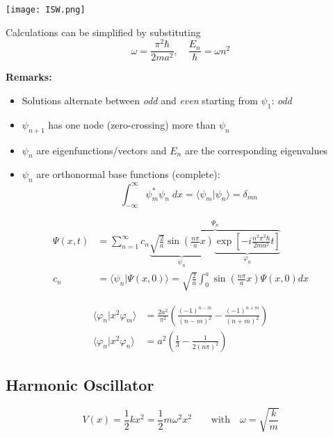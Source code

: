 \begin{center}
    \texttt{[image: ISW.png]}
\end{center}

Calculations can be simplified by substituting
\begin{equation*}
    \omega = \frac{\pi^2 \hbar}{2m a^2},\quad \frac{E_n}{\hbar} = \omega n^2
\end{equation*}

\textbf{Remarks:}
\begin{itemize}
    \item Solutions alternate between \textit{odd} and \textit{even} starting from $\psi_1$: \textit{odd}
    \item $\psi_{n+1}$ has one node (zero-crossing) more than $\psi_n$
    \item $\psi_n$ are eigenfunctions/vectors and $E_n$ are the corresponding eigenvalues
    \item $\psi_n$ are orthonormal base functions (complete):
          \noindent\begin{equation*}
              \int_{-\infty}^{\infty} \psi_m^*\psi_n\; dx =\langle \psi_m|\psi_n\rangle= \delta_{mn}
          \end{equation*}
\end{itemize}

\noindent\begin{align*}
    \Psi(x,t) & =\sum_{n=1}^{\infty}c_{n} \overbrace{\underbrace{\sqrt{\frac{2}{a}}\sin\left(\frac{n\pi}{a}x\right)}_{\psi_n} \underbrace{\exp\left[-i\frac{n^{2}\pi^{2}\hbar}{2ma^{2}}t\right]}_{\varphi_n}}^{\Psi_n} \\
    c_n       & =\langle \psi_n|\Psi(x,0)\rangle = \sqrt{\frac{2}{a}}\int_0^a\sin\left(\frac{n\pi}{a}x\right)\Psi(x,0)dx
\end{align*}

\noindent\begin{align*}
    \langle \varphi_n|x^2\varphi_m\rangle & = \frac{2a^2}{\pi^2}\left(\frac{{(-1)}^{n-m}}{{(n-m)}^2}-\frac{{(-1)}^{n+m}}{{(n+m)}^2}\right) \\
    \langle \varphi_n|x^2\varphi_n\rangle & = a^2\left(\frac{1}{3} -\frac{1}{2{(n\pi)}^2}\right)
\end{align*}

\subsection{Harmonic Oscillator}
\noindent\begin{equation*}
    V(x) = \frac{1}{2}k x^2 = \frac{1}{2}m \omega^2 x^2 \qquad \text{with} \quad \omega = \sqrt{\frac{k}{m}}
\end{equation*}

